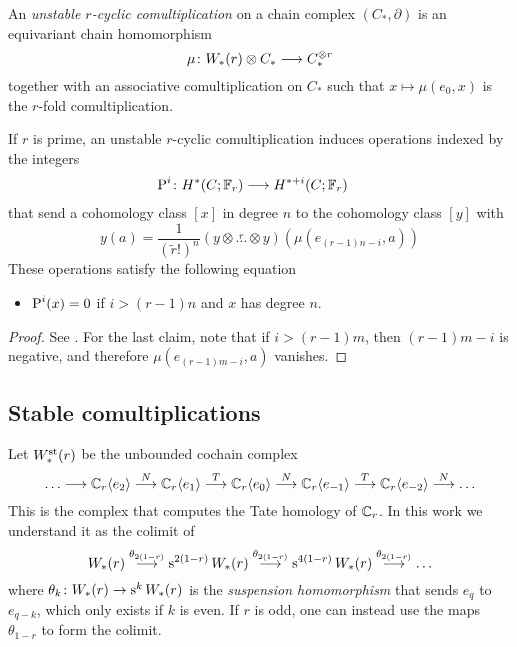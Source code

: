     An \emph{unstable $r$-cyclic comultiplication} on a chain complex $(C_*,\partial)$ is an equivariant chain homomorphism
    \[\mu\colon W_*(r)\otimes C_*\longrightarrow C_*^{\otimes r}\]
together with an associative comultiplication on $C_*$ such that $x\mapsto \mu(e_0,x)$ is the $r$-fold comultiplication.
\begin{proposition}\label{prop:unstable}
    If $r$ is prime, an unstable $r$-cyclic comultiplication induces operations indexed by the integers
\begin{align*}
    \operatorname{P}^{i}\colon H^*(C;\mathbb{F}_r)&\longrightarrow H^{*+i}(C;\mathbb{F}_r)
\end{align*}
that send a cohomology class $[x]$ in degree $n$ to the cohomology class $[y]$ with 
\[
    y(a) = \frac{1}{(\tilde{r}!)^n}(y\otimes \overset{r}{\ldots}\otimes y)(\mu(e_{(r-1)n-i},a))
\]
These operations satisfy the following equation
\begin{itemize}
    \item $\operatorname{P}^i(x) = 0$ if $i>(r-1)n$ and $x$ has degree $n$.
\end{itemize}
\end{proposition}
\begin{proof} See \cite{may1970general}.    %
    For the last claim, note that if $i>(r-1)m$, then $(r-1)m-i$ is negative, and therefore $\mu(e_{(r-1)m-i},a)$ vanishes.
    \end{proof}

\subsection{Stable comultiplications}
Let $W^{\mathrm{st}}_*(r)$ be the unbounded cochain complex
\[
\ldots\longrightarrow \mathbb{C}_r\langle e_2\rangle \overset{N}{\longrightarrow}
\mathbb{C}_r\langle e_1\rangle \overset{T}{\longrightarrow}
\mathbb{C}_r\langle e_0\rangle \overset{N}{\longrightarrow}
\mathbb{C}_r\langle e_{-1}\rangle \overset{T}{\longrightarrow}
\mathbb{C}_r\langle e_{-2}\rangle \overset{N}{\longrightarrow}
\ldots
\]
This is the complex that computes the Tate homology of $\mathbb{C}_r$. In this work we understand it as the colimit of
\[
    W_*(r)\overset{\theta_{2(1-r)}}{\longrightarrow} \operatorname{s}^{2(1-r)} W_*(r) \overset{\theta_{2(1-r)}}{\longrightarrow} \operatorname{s}^{4(1-r)} W_*(r) \overset{\theta_{2(1-r)}}{\longrightarrow} \ldots
\]
where $\theta_{k}\colon W_*(r)\to \operatorname{s}^{k} W_*(r)$ is the \emph{suspension homomorphism} that sends $e_{q}$ to $e_{q-k}$, which only exists if $k$ is even. If $r$ is odd, one can instead use the maps $\theta_{1-r}$ to form the colimit.


